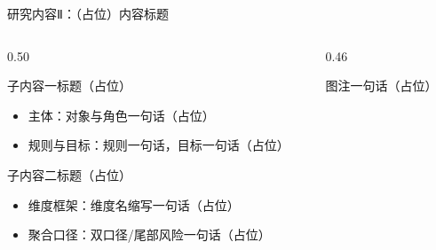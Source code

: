 \documentclass[aspectratio=169,11pt]{beamer}
\begin{document}
\begin{frame}{研究内容Ⅱ：（占位）内容标题}
  \footnotesize
  \begin{columns}[T]
    \begin{column}{0.50\textwidth}
      \begin{dmupoint}{子内容一标题（占位）}
        \begin{itemize}
          \item \textcolor{dmuhead}{主体}：对象与角色一句话（占位）
          \item \textcolor{dmuhead}{规则与目标}：规则一句话，目标一句话（占位）
        \end{itemize}
      \end{dmupoint}
      \begin{dmupoint}{子内容二标题（占位）}
        \begin{itemize}
          \item \textcolor{dmuhead}{维度框架}：维度名缩写一句话（占位）
          \item \textcolor{dmuhead}{聚合口径}：双口径/尾部风险一句话（占位）
        \end{itemize}
      \end{dmupoint}
    \end{column}
    \begin{column}{0.46\textwidth}
      \begin{center}

        \vskip0.8mm
        {\scriptsize\color{dmugray} 图注一句话（占位）}
      \end{center}
    \end{column}
  \end{columns}
\end{frame}
\end{document}
